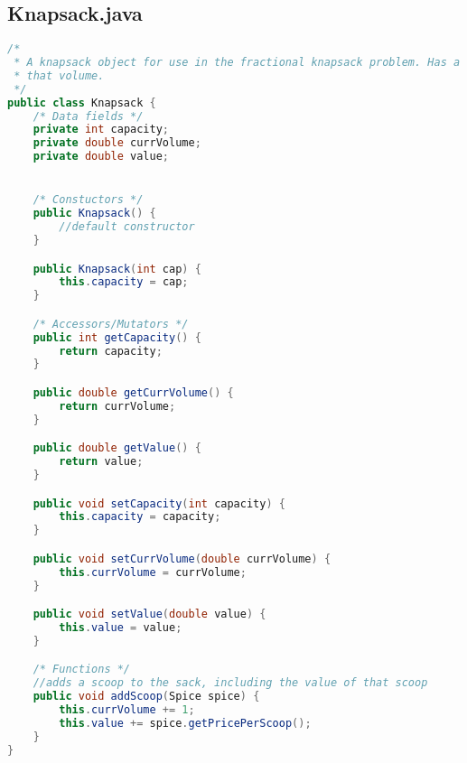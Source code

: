 \documentclass[letterpaper, 10pt,DIV=13]{scrartcl}
\numberwithin{equation}{section} %
\numberwithin{figure}{section} %
\numberwithin{table}{section} %
\begin{document}
\subsection{Knapsack.java}
\begin{lstlisting}[frame=single, language=java, breaklines]  
/*
 * A knapsack object for use in the fractional knapsack problem. Has a capcity, and maintains its current volume and the value of
 * that volume.
 */
public class Knapsack {
    /* Data fields */
    private int capacity;
    private double currVolume;
    private double value;


    /* Constuctors */
    public Knapsack() {
        //default constructor
    }

    public Knapsack(int cap) {
        this.capacity = cap;
    }

    /* Accessors/Mutators */
    public int getCapacity() {
        return capacity;
    }

    public double getCurrVolume() {
        return currVolume;
    }

    public double getValue() {
        return value;
    }

    public void setCapacity(int capacity) {
        this.capacity = capacity;
    }

    public void setCurrVolume(double currVolume) {
        this.currVolume = currVolume;
    }

    public void setValue(double value) {
        this.value = value;
    }

    /* Functions */
    //adds a scoop to the sack, including the value of that scoop
    public void addScoop(Spice spice) {
        this.currVolume += 1;
        this.value += spice.getPricePerScoop();   
    }
}
\end{lstlisting}
\end{document}
